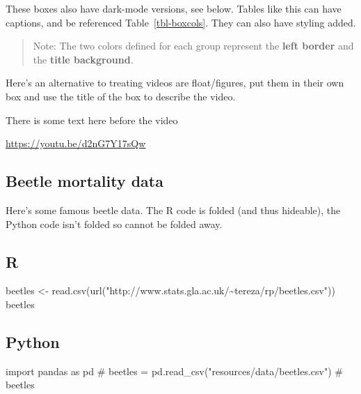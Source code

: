 \documentclass[
  a4paper,
  DIV=11,
  numbers=noendperiod,
  oneside]{scrreport}
\newenvironment{Shaded}{\begin{snugshade}}{\end{snugshade}}
\newcommand{\CommentTok}[1]{\textcolor[rgb]{0.37,0.37,0.37}{#1}}
\newcommand{\FunctionTok}[1]{\textcolor[rgb]{0.28,0.35,0.67}{#1}}
\newcommand{\ImportTok}[1]{\textcolor[rgb]{0.00,0.46,0.62}{#1}}
\newcommand{\NormalTok}[1]{\textcolor[rgb]{0.00,0.23,0.31}{#1}}
\newcommand{\OtherTok}[1]{\textcolor[rgb]{0.00,0.23,0.31}{#1}}
\newcommand{\StringTok}[1]{\textcolor[rgb]{0.13,0.47,0.30}{#1}}
\newenvironment{fbxSimple}[3]{\begin{tcolorbox}[enhanced, breakable,%
attach boxed title to top*={xshift=1.4pt},
boxed title style={boxrule=0.0mm, fuzzy shadow={1pt}{-1pt}{0mm}{0.1mm}{gray}, arc=.3em, rounded corners=east, sharp corners=west}, colframe=#1-color2, colbacktitle=#1-color1, colback = white, coltitle=black,  titlerule=0mm, toprule=0pt, bottomrule=.7pt, leftrule=.3em, rightrule=.7pt, outer arc=.3em,  	left=.5em, right=.5em, bottomtitle=1mm, toptitle=1mm,title=\textbf{#2}\hspace{0.5em}{#3}]}
{\end{tcolorbox}}
\begin{document}
These boxes also have dark-mode versions, see below. Tables like this
can have captions, and be referenced Table~\ref{tbl-boxcols}. They can
also have styling added.

\begin{quote}
Note: The two colors defined for each group represent the \textbf{left
border} and the \textbf{title background}.
\end{quote}

Here's an alternative to treating videos are float/figures, put them in
their own box and use the title of the box to describe the video.

\label{vidFirst}
\begin{fbxSimple}{Video}{Video 1: }{Binomial response models applied to beetle mortality data (9m59)}
\label{vidFirst}
There is some text here before the video

\url{https://youtu.be/d2nG7Y17sQw}

\end{fbxSimple}

\subsection{Beetle mortality data}\label{beetle-mortality-data}

Here's some famous beetle data. The R code is folded (and thus
hideable), the Python code isn't folded so cannot be folded away.

\subsection{R}

\begin{Shaded}
\begin{Highlighting}[]
\NormalTok{beetles }\OtherTok{\textless{}{-}} \FunctionTok{read.csv}\NormalTok{(}\FunctionTok{url}\NormalTok{(}\StringTok{"http://www.stats.gla.ac.uk/\textasciitilde{}tereza/rp/beetles.csv"}\NormalTok{))}
\NormalTok{beetles}
\end{Highlighting}
\end{Shaded}

\subsection{Python}

\begin{Shaded}
\begin{Highlighting}[]
\ImportTok{import}\NormalTok{ pandas }\ImportTok{as}\NormalTok{ pd}
\CommentTok{\# beetles = pd.read\_csv("resources/data/beetles.csv")}
\CommentTok{\# beetles}
\end{Highlighting}
\end{Shaded}
\end{document}
